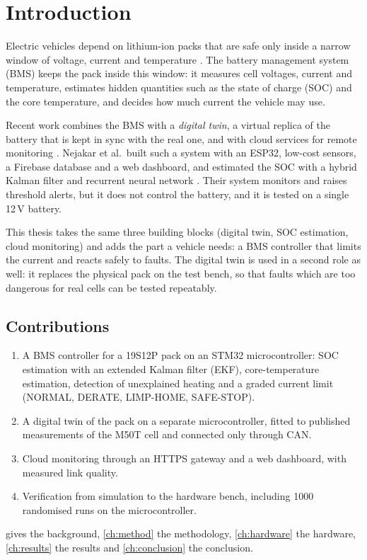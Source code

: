 \chapter{Introduction}\label{ch:intro}

Electric vehicles depend on lithium-ion packs that are safe only inside a narrow window of voltage, current and temperature \citep{feng2018}. The battery management system (BMS) keeps the pack inside this window: it measures cell voltages, current and temperature, estimates hidden quantities such as the state of charge (SOC) and the core temperature, and decides how much current the vehicle may use.

Recent work combines the BMS with a \emph{digital twin}, a virtual replica of the battery that is kept in sync with the real one, and with cloud services for remote monitoring \citep{li2020,nejakar2025}. Nejakar et al.\ built such a system with an ESP32, low-cost sensors, a Firebase database and a web dashboard, and estimated the SOC with a hybrid Kalman filter and recurrent neural network \citep{nejakar2025}. Their system monitors and raises threshold alerts, but it does not control the battery, and it is tested on a single 12\,V battery.

This thesis takes the same three building blocks (digital twin, SOC estimation, cloud monitoring) and adds the part a vehicle needs: a BMS controller that limits the current and reacts safely to faults. The digital twin is used in a second role as well: it replaces the physical pack on the test bench, so that faults which are too dangerous for real cells can be tested repeatably.

\section*{Contributions}
\begin{enumerate}
  \item A BMS controller for a 19S12P pack on an STM32 microcontroller: SOC estimation with an extended Kalman filter (EKF), core-temperature estimation, detection of unexplained heating and a graded current limit (NORMAL, DERATE, LIMP-HOME, SAFE-STOP).
  \item A digital twin of the pack on a separate microcontroller, fitted to published measurements of the M50T cell \citep{kirkaldy2024} and connected only through CAN.
  \item Cloud monitoring through an HTTPS gateway and a web dashboard, with measured link quality.
  \item Verification from simulation to the hardware bench, including 1000 randomised runs on the microcontroller.
\end{enumerate}

 gives the background, \cref{ch:method} the methodology, \cref{ch:hardware} the hardware, \cref{ch:results} the results and \cref{ch:conclusion} the conclusion.
